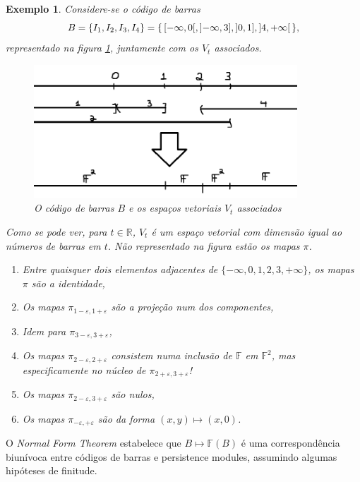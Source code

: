 \documentclass[11pt]{article}
\newtheorem{ex}{Exemplo}
\theoremstyle{nonumberplain}
\newcommand{\R}{\mathbb{R}}
\newcommand{\FF}{\mathbb{F}}
\begin{document}
\begin{ex}
Considere-se o código de barras
\begin{equation}
B = \{I_1, I_2, I_3, I_4\} = \{\,\rinterval{-\infty}0, \linterval{-\infty}3, \linterval 0 1, \ointerval 4 {+\infty} \,\},
\end{equation}
representado na figura \ref{bc2}, juntamente com os $V_t$ associados.

\begin{figure}[H]
\centering
\includegraphics[height=5cm]{bc2}
\caption{O código de barras $B$ e os espaços vetoriais $V_t$ associados}\label{bc2}
\end{figure}

Como se pode ver, para $t \in \R$, $V_t$ é um espaço vetorial com dimensão igual ao números de barras em $t$. Não representado na figura estão os mapas $\pi$.
\begin{enumerate}
\item Entre quaisquer dois elementos adjacentes de $\{-\infty,0,1,2,3,+\infty\}$, os mapas $\pi$ são a identidade,
\item Os mapas $\pi_{1-\varepsilon, 1+\varepsilon}$ são a projeção num dos componentes,
\item Idem para $\pi_{3-\varepsilon, 3+\varepsilon}$,
\item Os mapas $\pi_{2-\varepsilon,2+\varepsilon}$ consistem numa inclusão de $\FF$ em $\FF^2$, mas especificamente \emph{no núcleo de $\pi_{2+\varepsilon, 3+\varepsilon}$!}
\item Os mapas $\pi_{2-\varepsilon,3+\varepsilon}$ são nulos,
\item Os mapas $\pi_{-\varepsilon,+\varepsilon}$ são da forma $(x,y) \mapsto (x,0)$.
\end{enumerate}
\end{ex}

O \emph{Normal Form Theorem} estabelece que $B \mapsto \FF(B)$ é uma correspondência biunívoca entre códigos de barras e persistence modules, assumindo algumas hipóteses de finitude.
\end{document}
